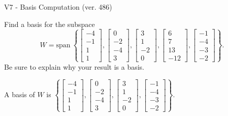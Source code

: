 \begin{exercise}
  \begin{exerciseTitle}V7 - Basis Computation (ver. 486)\end{exerciseTitle}
  \begin{exerciseStatement}
    Find a basis for the subspace 
\[W=\mathrm{span}\ \left\{\left[\begin{array}{r}
-4 \\
-1 \\
1 \\
1
\end{array}\right] , \left[\begin{array}{r}
0 \\
-2 \\
-4 \\
3
\end{array}\right] , \left[\begin{array}{r}
3 \\
1 \\
-2 \\
0
\end{array}\right] , \left[\begin{array}{r}
6 \\
7 \\
13 \\
-12
\end{array}\right] , \left[\begin{array}{r}
-1 \\
-4 \\
-3 \\
-2
\end{array}\right]\right\}.\]
 Be sure to explain why your result is a basis.


  \end{exerciseStatement}
  \begin{exerciseAnswer}
   A basis of \(W\) is  \(\left\{\left[\begin{array}{r}
-4 \\
-1 \\
1 \\
1
\end{array}\right] , \left[\begin{array}{r}
0 \\
-2 \\
-4 \\
3
\end{array}\right] , \left[\begin{array}{r}
3 \\
1 \\
-2 \\
0
\end{array}\right] , \left[\begin{array}{r}
-1 \\
-4 \\
-3 \\
-2
\end{array}\right]\right\}\).
  


  \end{exerciseAnswer}
\end{exercise}